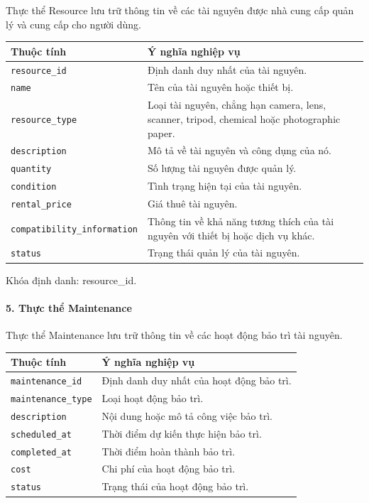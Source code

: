 Thực thể Resource lưu trữ thông tin về các tài nguyên được nhà cung cấp quản lý và cung cấp cho người dùng.

\begin{center}
\scriptsize
\begin{tabular}{p{.30\linewidth} p{.58\linewidth}}
\toprule
Thuộc tính & Ý nghĩa nghiệp vụ \\
\midrule
\texttt{resource\_id} & Định danh duy nhất của tài nguyên. \\
\texttt{name} & Tên của tài nguyên hoặc thiết bị. \\
\texttt{resource\_type} & Loại tài nguyên, chẳng hạn camera, lens, scanner, tripod, chemical hoặc photographic paper. \\
\texttt{description} & Mô tả về tài nguyên và công dụng của nó. \\
\texttt{quantity} & Số lượng tài nguyên được quản lý. \\
\texttt{condition} & Tình trạng hiện tại của tài nguyên. \\
\texttt{rental\_price} & Giá thuê tài nguyên. \\
\texttt{compatibility\_information} & Thông tin về khả năng tương thích của tài nguyên với thiết bị hoặc dịch vụ khác. \\
\texttt{status} & Trạng thái quản lý của tài nguyên. \\
\bottomrule
\end{tabular}
\end{center}

Khóa định danh: resource\_id.

\paragraph{5. Thực thể Maintenance}\mbox{}\par

Thực thể Maintenance lưu trữ thông tin về các hoạt động bảo trì tài nguyên.

\begin{center}
\scriptsize
\begin{tabular}{p{.25\linewidth} p{.65\linewidth}}
\toprule
Thuộc tính & Ý nghĩa nghiệp vụ \\
\midrule
\texttt{maintenance\_id} & Định danh duy nhất của hoạt động bảo trì. \\
\texttt{maintenance\_type} & Loại hoạt động bảo trì. \\
\texttt{description} & Nội dung hoặc mô tả công việc bảo trì. \\
\texttt{scheduled\_at} & Thời điểm dự kiến thực hiện bảo trì. \\
\texttt{completed\_at} & Thời điểm hoàn thành bảo trì. \\
\texttt{cost} & Chi phí của hoạt động bảo trì. \\
\texttt{status} & Trạng thái của hoạt động bảo trì. \\
\bottomrule
\end{tabular}
\end{center}

